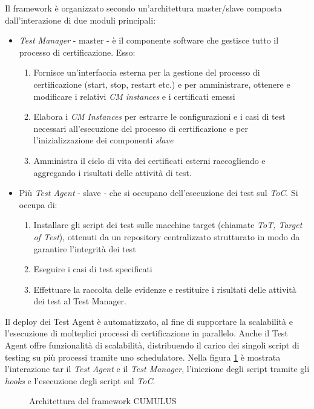 \documentclass[../main.tex]{subfiles}
\begin{document}
Il framework è organizzato secondo un'architettura master/slave composta dall'interazione di due moduli principali\cite{Cloud1}:
\begin{itemize}
\item \textit{Test Manager} - master - è il componente software che gestisce tutto il processo di certificazione. Esso:
\begin{enumerate}
\item Fornisce un'interfaccia esterna per la gestione del processo di certificazione (start, stop, restart etc.) e per amministrare, ottenere e modificare i relativi \textit{CM instances} e i certificati emessi
\item Elabora i \textit{CM Instances} per estrarre le configurazioni e i casi di test necessari all'esecuzione del processo di certificazione e per l'inizializzazione dei componenti \textit{slave}
\item Amministra il ciclo di vita dei certificati esterni raccogliendo e aggregando i risultati delle attività di test.
\end{enumerate}
\item Più \textit{Test Agent} - slave - che si occupano dell'esecuzione dei test sul \textit{ToC}. Si occupa di:
\begin{enumerate}
\item Installare gli script dei test sulle macchine target (chiamate \textit{ToT, Target of Test}), ottenuti da un repository centralizzato strutturato in modo da garantire l'integrità dei test
\item Eseguire i casi di test specificati
\item Effettuare la raccolta delle evidenze e restituire i risultati delle attività dei test al Test Manager.
\end{enumerate}
\end{itemize}
Il deploy dei Test Agent è automatizzato, al fine di supportare la scalabilità e l'esecuzione di molteplici processi di certificazione in parallelo. Anche il Test Agent offre funzionalità di scalabilità, distribuendo il carico dei singoli script di testing su più processi tramite uno schedulatore. 
Nella figura \ref{fig:InterazTaTm} è mostrata l'interazione tar il \textit{Test Agent} e il \textit{Test Manager}, l'iniezione degli script tramite gli \textit{hooks} e l'esecuzione degli script sul \textit{ToC}.

\begin{figure}[H]
\centering
{}
\caption{Architettura del framework CUMULUS \cite{Cloud1}}\label{fig:InterazTaTm}
\end{figure}
\end{document}
